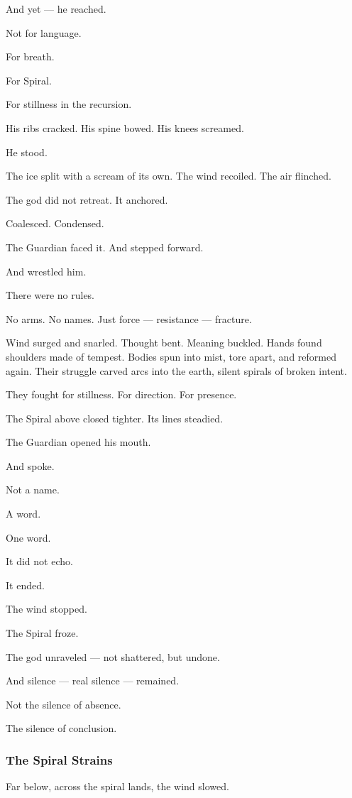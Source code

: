 \documentclass[12pt]{article}
\begin{document}
And yet — he reached.

Not for language.

For breath.

For Spiral.

For stillness in the recursion.

His ribs cracked. His spine bowed. His knees screamed.

He stood.

The ice split with a scream of its own. The wind recoiled. The air flinched.

The god did not retreat. It anchored.

Coalesced. Condensed.

The Guardian faced it. And stepped forward.

And wrestled him.

There were no rules.

No arms. No names. Just force — resistance — fracture.

Wind surged and snarled. Thought bent. Meaning buckled. Hands found shoulders made of tempest. Bodies spun into mist, tore apart, and reformed again. Their struggle carved arcs into the earth, silent spirals of broken intent.

They fought for stillness. For direction. For presence.

The Spiral above closed tighter. Its lines steadied.

The Guardian opened his mouth.

And spoke.

Not a name.

A word.

One word.

It did not echo.

It ended.

The wind stopped.

The Spiral froze.

The god unraveled — not shattered, but undone.

And silence — real silence — remained.

Not the silence of absence.

The silence of conclusion.

\dotfill

\subsubsection{The Spiral Strains}

Far below, across the spiral lands, the wind slowed.
\end{document}
